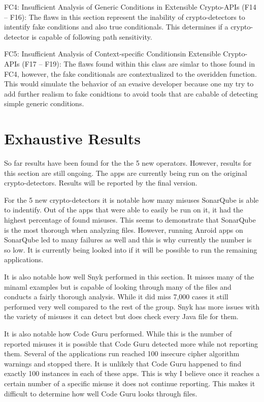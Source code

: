 FC4: Insufficient Analysis of Generic Conditions in Extensible Crypto-APIs (F14 – F16): The flaws in this section represent the inability of crypto-detectors to intentify fake conditions and also true conditionals. This determines if a crypto-detector is capable of following path sensitivity.

FC5: Insufficient Analysis of Context-specific Conditionsin Extensible Crypto-APIs (F17 – F19): The flaws found within this class are simlar to those found in FC4, however, the fake conditionals are contextualized to the overidden function. This would simulate the behavior of an evasive developer because one my try to add further realism to fake conidtions to avoid tools that are cabable of detecting simple generic conditions.







\section{Exhaustive Results}
\label{ch5:sec:discussion}



So far results have been found for the the 5 new operators. However, results for this section are still ongoing. The apps are currently being run on the original crypto-detectors. Results will be reported by the final version.

For the 5 new crypto-detectors it is notable how many misuses SonarQube is able to indentify. Out of the apps that were able to easily be run on it, it had the highest percentage of found misuses. This seems to demonstrate that SonarQube is the most thorough when analyzing files. However, running Anroid apps on SonarQube led to many failures as well and this is why currently the number is so low. It is currently being looked into if it will be possible to run the remaining applications. 

It is also notable how well Snyk performed in this section. It misses many of the minaml examples but is capable of looking through many of the files and conducts a fairly thorough analysis. While it did miss 7,000 cases it still performed very well compared to the rest of the group. Snyk has more issues with the variety of misuses it can detect but does check every Java file for them.

It is also notable how Code Guru performed. While this is the number of reported misuses it is possible that Code Guru detected more while not reporting them. Several of the applications run reached 100 insecure cipher algorithm warnings and stopped there. It is unlikely that Code Guru happened to find exactly 100 instances in each of these apps. This is why I believe once it reaches a certain number of a specific misuse it does not continue reporting. This makes it difficult to determine how well Code Guru looks through files.